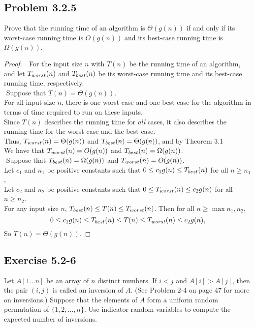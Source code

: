 \documentclass{article}
\begin{document}
\subsection*{Problem 3.2.5}
Prove that the running time of an algorithm is $ \Theta(g(n)) $ if and only if its worst-case
running time is $ O(g(n)) $ and its best-case running time is $ \Omega(g(n)) $.
\begin{proof}
    $ $\newline
    $ $\newline
    For the input size $n$ with $T(n)$ be the running time of an algorithm, 
    and let $T_{worst}(n)$ and $T_{best}(n)$ be its worst-case running time and its best-case running time, respectively. \\
    $ $\newline
    Suppose that $T(n)=\Theta(g(n))$. \\
    For all input size $n$, there is one worst case and one best case for the algorithm 
    in terms of time required to run on these inputs. \\
    Since $T(n)$ describes the running time for \emph{all} cases, it also describes the 
    running time for the worst case and the best case. \\
    Thus, $T_{worst}(n)=\Theta(g(n))$ and $T_{best}(n)=\Theta(g(n))$, and by Theorem 3.1 \\
    We have that $T_{worst}(n)=O(g(n))$ and $T_{best}(n)=\Omega(g(n))$. \\
    $ $\newline
    Suppose that $T_{best}(n)=\Omega(g(n))$ and $T_{worst}(n)=O(g(n))$. \\
    Let $c_1$ and $n_1$ be positive constants such that $0\le c_1g(n)\le T_{best}(n)$ for all $n\ge n_1$, \\
    Let $c_2$ and $n_2$ be positive constants such that $0\le T_{worst}(n)\le c_2g(n)$ for all $n\ge n_2$. \\
    For any input size $n$, $T_{best}(n)\le T(n)\le T_{worst}(n)$.
    Then for all $n\ge\max{n_1,n_2}$,
    \[
        0 \le c_1g(n) \le T_{best}(n) \le T(n) \le T_{worst}(n) \le c_2g(n),
    \]
    So $T(n)=\Theta(g(n))$.
\end{proof}

\clearpage %
\subsection*{Exercise 5.2-6}
Let $A[1 \ldots n]$ be an array of $n$ distinct numbers. If $i < j$ and $A[i] > A[j]$, 
then the pair $(i, j)$ is called an inversion of $A$. 
(See Problem 2-4 on page 47 for more on inversions.) 
Suppose that the elements of $A$ form a uniform random permutation of $\{1, 2, \ldots, n\}$. 
Use indicator random variables to compute the expected number of inversions.
\end{document}
